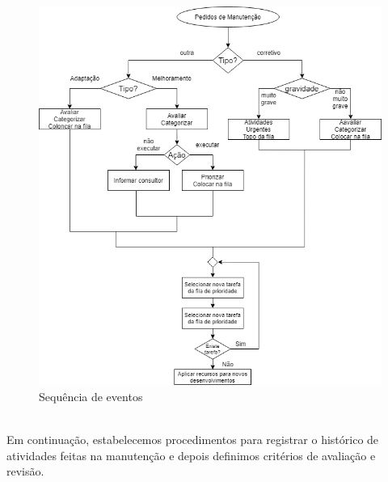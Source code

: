 \begin{figure}[H]
	\centering
	\includegraphics[width=15cm]{Pedidos_Manutencao_2}
	\caption{Sequência de eventos}
	\label{fig:Pedidos_Manutencao_2}
\end{figure}
\\
Em continuação, estabelecemos procedimentos para registrar o histórico de atividades feitas na manutenção e depois definimos critérios de avaliação e revisão.